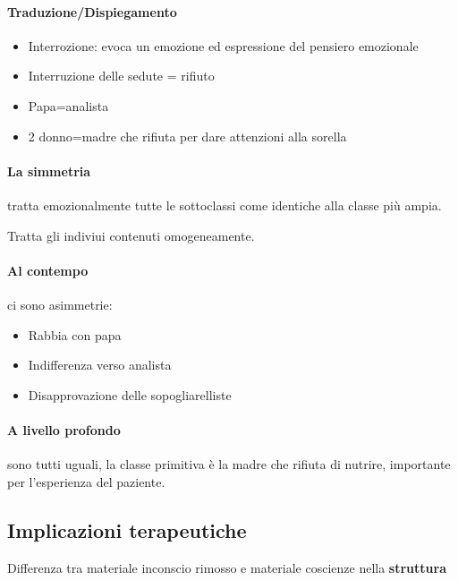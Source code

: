 \documentclass[12pt, a4paper]{article}
\begin{document}
\paragraph{Traduzione/Dispiegamento}  
\begin{itemize}
    \item Interrozione: evoca un emozione ed espressione del pensiero emozionale
    \item Interruzione delle sedute = rifiuto
    \item Papa=analista
    \item 2 donno=madre che rifiuta per dare attenzioni alla sorella
\end{itemize}

\paragraph{La simmetria}  tratta emozionalmente tutte le sottoclassi come identiche alla classe più ampia.

Tratta gli indiviui contenuti omogeneamente.

\paragraph{Al contempo }  ci sono asimmetrie:
\begin{itemize}
    \item Rabbia con papa
    \item Indifferenza verso analista
    \item Disapprovazione delle sopogliarelliste
\end{itemize}

\paragraph{A livello profondo}  sono tutti uguali, la classe primitiva è la madre che rifiuta di nutrire, importante per l'esperienza del paziente.

\subsection{Implicazioni terapeutiche}

Differenza tra materiale inconscio rimosso e materiale coscienze nella \textbf{struttura}
\end{document}
